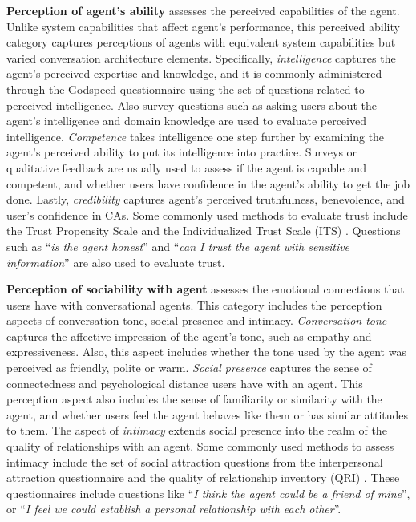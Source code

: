 \textbf{Perception of agent's ability} assesses the perceived capabilities of the agent. Unlike system capabilities that affect agent's performance, this perceived ability category captures perceptions of agents with equivalent system capabilities but varied conversation architecture elements. Specifically, \textit{intelligence} captures the agent's perceived expertise and knowledge, and it is commonly administered through the Godspeed questionnaire \cite{bartneck2009measurement} using the set of questions related to perceived intelligence. Also survey questions such as asking users about the agent's intelligence and domain knowledge are used to evaluate perceived intelligence. \textit{Competence} takes intelligence one step further by examining the agent's perceived ability to put its intelligence into practice. Surveys or qualitative feedback are usually used to assess if the agent is capable and competent, and whether users have confidence in the agent's ability to get the job done. Lastly, \textit{credibility} captures agent's perceived truthfulness, benevolence, and user's confidence in CAs. Some commonly used methods to evaluate trust include the Trust Propensity Scale \cite{mayer1999effect} and the Individualized Trust Scale (ITS) \cite{wheeless1977measurement}. Questions such as ``\textit{is the agent honest}'' and ``\textit{can I trust the agent with sensitive information}'' are also used to evaluate trust.

\textbf{Perception of sociability with agent} assesses the emotional connections that users have with conversational agents. This category includes the perception aspects of conversation tone, social presence and intimacy. \textit{Conversation tone} captures the affective impression of the agent's tone, such as empathy and expressiveness. Also, this aspect includes whether the tone used by the agent was perceived as friendly, polite or warm. \textit{Social presence} captures the sense of connectedness and psychological distance users have with an agent. This perception aspect also includes the sense of familiarity or similarity with the agent, and whether users feel the agent behaves like them or has similar attitudes to them. The aspect of \textit{intimacy} extends social presence into the realm of the quality of relationships with an agent. Some commonly used methods to assess intimacy include the set of social attraction questions from the interpersonal attraction questionnaire \cite{mccroskey1975development} and the quality of relationship inventory (QRI) \cite{pierce1997assessing}. These questionnaires include questions like ``\textit{I think the agent could be a friend of mine}'', or ``\textit{I feel we could establish a personal relationship with each other}''.

